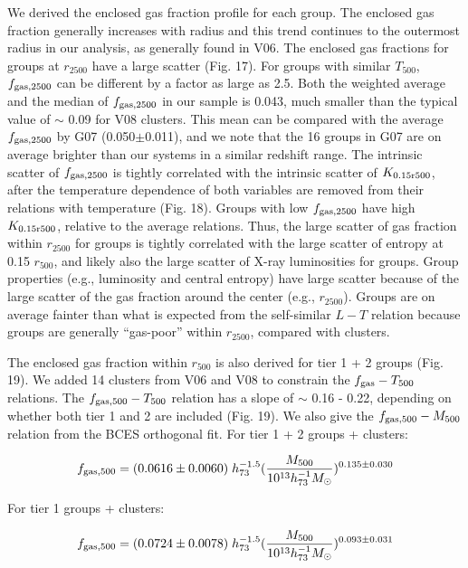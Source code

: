 \documentclass{aastex}
\begin{document}
We derived the enclosed gas fraction profile for each group. The enclosed gas fraction
generally increases with radius and this trend continues to the outermost radius
in our analysis, as generally found in V06. The enclosed gas fractions for groups at
$r_{2500}$ have a large scatter (Fig. 17). For groups with similar $T_{500}$,
$f_{\rm gas, 2500}$ can be different by a factor as large as 2.5.
Both the weighted average and the median of $f_{\rm gas, 2500}$ in our sample is
0.043, much smaller than the typical value of $\sim$ 0.09 for V08 clusters.
This mean can be compared with the average $f_{\rm gas, 2500}$ by G07 (0.050$\pm$0.011),
and we note that the 16 groups in G07 are on average brighter than our
systems in a similar redshift range.
The intrinsic scatter of $f_{\rm gas, 2500}$ is tightly correlated with the intrinsic
scatter of $K_{\rm 0.15 r500}$, after the temperature dependence of both variables are removed
from their relations with temperature (Fig. 18).
Groups with low $f_{\rm gas, 2500}$ have high $K_{\rm 0.15 r500}$, relative to
the average relations. Thus, the large scatter of gas fraction within $r_{2500}$ for
groups is tightly correlated with the large scatter of entropy at 0.15 $r_{500}$,
and likely also the large scatter of X-ray luminosities for groups. Group properties (e.g.,
luminosity and central entropy) have large scatter because of the large scatter of
the gas fraction around the center (e.g., $r_{2500}$). Groups are on average
fainter than what is expected from the self-similar $L - T$ relation because groups
are generally ``gas-poor'' within $r_{2500}$, compared with clusters.

The enclosed gas fraction within $r_{500}$ is also derived for tier 1 + 2 groups
(Fig. 19). We added 14 clusters from V06 and V08 to constrain the $f_{\rm gas} - T_{500}$
relations. The $f_{\rm gas, 500} - T_{500}$ relation has a slope of $\sim$ 0.16 - 0.22,
depending on whether both tier 1 and 2 are included (Fig. 19). 
We also give the $f_{\rm gas, 500} - M_{500}$ relation from the BCES orthogonal fit.
For tier 1 + 2 groups + clusters:

\begin{equation}
f_{\rm gas, 500} = (0.0616\pm0.0060) \hspace{0.1cm} h_{73}^{-1.5} (\frac{M_{500}}{10^{13} h_{73}^{-1} M_{\odot}})^{0.135\pm0.030}
\end{equation}

For tier 1 groups + clusters:

\begin{equation}
f_{\rm gas, 500} = (0.0724\pm0.0078) \hspace{0.1cm} h_{73}^{-1.5} (\frac{M_{500}}{10^{13} h_{73}^{-1} M_{\odot}})^{0.093\pm0.031}
\end{equation}
\end{document}
